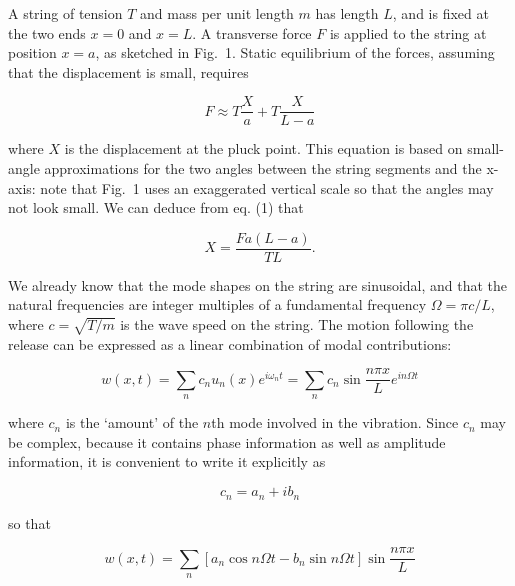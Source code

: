   A string of tension $T$ and mass per unit length $m$ has length $L$, and is 
  fixed at the two ends $x=0$ and $x=L$. A transverse force $F$ is applied to 
  the string at position $x=a$, as sketched in Fig.\ 1. Static equilibrium of 
  the forces, assuming that the displacement is small, requires 

  \begin{equation*}F \approx T \dfrac{X}{a}+ T \dfrac{X}{L-a} 
  \tag{1}\end{equation*} 

  \noindent{}where $X$ is the displacement at the pluck point. This equation is 
  based on small-angle approximations for the two angles between the string 
  segments and the x-axis: note that Fig.\ 1 uses an exaggerated vertical scale 
  so that the angles may not look small. We can deduce from eq. (1) that 

  \begin{equation*}X=\dfrac{Fa(L-a)}{TL}. \tag{2}\end{equation*} 


  We already know that the mode shapes on the string are sinusoidal, and that 
  the natural frequencies are integer multiples of a fundamental frequency 
  $\Omega = \pi c/L$, where $c=\sqrt{T/m}$ is the wave speed on the string. The 
  motion following the release can be expressed as a linear combination of 
  modal contributions: 

  \begin{equation*}w(x,t)=\sum_n{c_n u_n(x) e^{i \omega_n t}}=\sum_n{c_n \sin 
  \dfrac{n \pi x}{L} e^{in \Omega t}} \tag{3}\end{equation*} 

  \noindent{}where $c_n$ is the `amount' of the $n$th mode involved in the 
  vibration. Since $c_n$ may be complex, because it contains phase information 
  as well as amplitude information, it is convenient to write it explicitly as 

  \begin{equation*}c_n=a_n +i b_n \tag{4}\end{equation*} 

  \noindent{}so that 

  \begin{equation*}w(x,t)=\sum_n{\left[ a_n \cos n \Omega t -b_n \sin n \Omega 
  t \right] \sin \dfrac{n \pi x}{L}} \tag{5}\end{equation*} 

